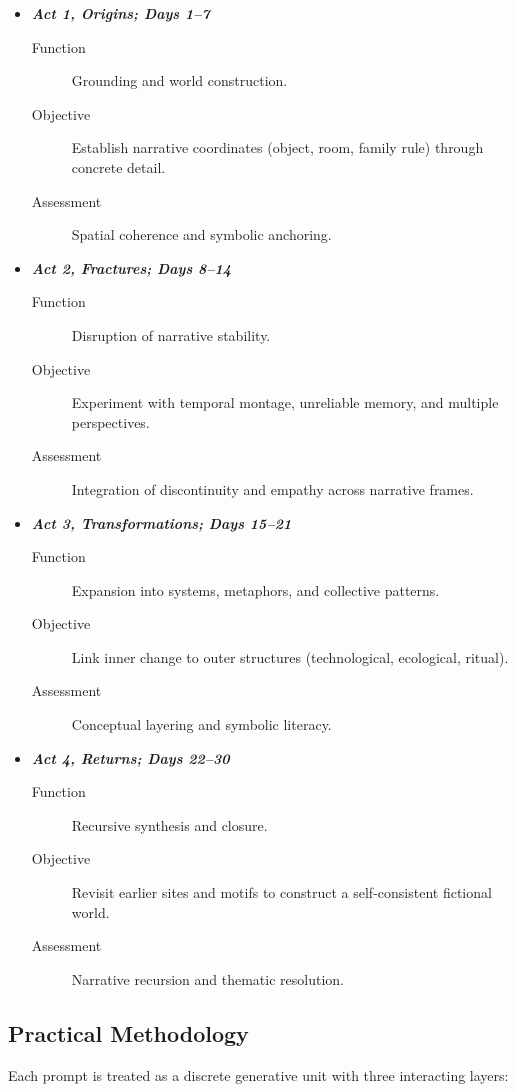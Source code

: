 \documentclass[11pt]{article}
\begin{document}
\begin{itemize}
\item \textbf{\emph{Act 1, Origins; Days 1–7}}
\begin{description}
\item[{Function}] Grounding and world construction.
\item[{Objective}] Establish narrative coordinates (object, room, family rule) through concrete detail.
\item[{Assessment}] Spatial coherence and symbolic anchoring.
\end{description}
\item \textbf{\emph{Act 2, Fractures; Days 8–14}}
\begin{description}
\item[{Function}] Disruption of narrative stability.
\item[{Objective}] Experiment with temporal montage, unreliable memory, and multiple perspectives.
\item[{Assessment}] Integration of discontinuity and empathy across narrative frames.
\end{description}
\item \textbf{\emph{Act 3, Transformations; Days 15–21}}
\begin{description}
\item[{Function}] Expansion into systems, metaphors, and collective patterns.
\item[{Objective}] Link inner change to outer structures (technological, ecological, ritual).
\item[{Assessment}] Conceptual layering and symbolic literacy.
\end{description}
\item \textbf{\emph{Act 4, Returns; Days 22–30}}
\begin{description}
\item[{Function}] Recursive synthesis and closure.
\item[{Objective}] Revisit earlier sites and motifs to construct a self-consistent fictional world.
\item[{Assessment}] Narrative recursion and thematic resolution.
\end{description}
\end{itemize}
\subsection*{Practical Methodology}
\label{sec:orgf8eb74b}

Each prompt is treated as a discrete generative unit with three interacting layers:
\end{document}
